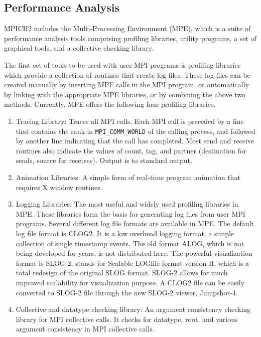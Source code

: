 \documentclass[dvipdfm,11pt]{article}
\begin{document}
\subsection{Performance Analysis}
MPICH2 includes the Multi-Processing Environment (MPE), which is a
suite of performance analysis tools comprising profiling libraries,
utility programs, a set of graphical tools, and a collective checking library. 

The first set of tools to be used with user MPI programs is profiling libraries
which provide a collection of routines that create log files.  These log files
can be created manually by inserting MPE calls in the MPI program, or
automatically by linking with the appropriate MPE libraries, or by combining
the above two methods.  Currently, MPE offers the following four profiling
libraries.

\begin{enumerate}
   \item Tracing Library: Traces all MPI calls.  Each MPI call is preceded by a
      line that contains the rank in \texttt{MPI\_COMM\_WORLD} of the calling process,
      and followed by another line indicating that the call has completed.
      Most send and receive routines also indicate the values of count, tag,
      and partner (destination for sends, source for receives).  Output is to
      standard output.

   \item Animation Libraries: A simple form of real-time program animation
      that requires X window routines.

   \item Logging Libraries: The most useful and widely used profiling libraries
      in MPE.  These libraries form the basis for generating log files from
      user MPI programs.  Several different log file formats are
      available in MPE.  The default log file format is CLOG2.  It is a low
      overhead logging format, a simple collection of single timestamp events.
      The old format ALOG, which is not being developed for years, is not
      distributed here.  The powerful visualization format is SLOG-2, stands
      for Scalable LOGfile format version II, which is a total redesign of the
      original SLOG format.  SLOG-2 allows for much improved scalability for
      visualization purpose. A CLOG2 file can be easily converted to
      SLOG-2 file through the new SLOG-2 viewer, Jumpshot-4.

   \item Collective and datatype checking library: An argument consistency
      checking library for MPI collective calls.  It checks for datatype, root,
      and various argument consistency in MPI collective calls.
\end{enumerate}
\end{document}
